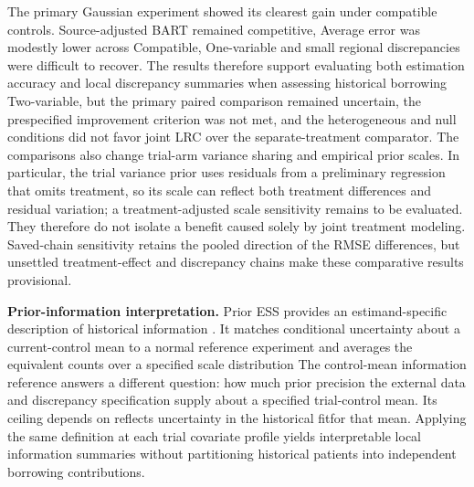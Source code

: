 \documentclass[11pt]{article}
\theoremstyle{remark}\newtheorem{remark}{Remark}[section]
\providecommand{\DIFaddtex}[1]{{\protect\color{blue} \sf #1}} %
\providecommand{\DIFdeltex}[1]{{\protect\color{red} \scriptsize #1}} %
\providecommand{\DIFaddbegin}{} %
\providecommand{\DIFaddend}{} %
\providecommand{\DIFdelbegin}{} %
\providecommand{\DIFdelend}{} %
\providecommand{\DIFadd}[1]{\texorpdfstring{\DIFaddtex{#1}}{#1}} %
\providecommand{\DIFdel}[1]{\texorpdfstring{\DIFdeltex{#1}}{}} %
\begin{document}
\DIFadd{The primary Gaussian experiment showed its clearest gain }\DIFaddend under compatible controls. \DIFdelbegin \DIFdel{Source-adjusted BART remained competitive, }\DIFdelend \DIFaddbegin \DIFadd{Average error was modestly lower across Compatible, One-variable }\DIFaddend and \DIFdelbegin \DIFdel{small regional discrepancies were difficult to recover. The results therefore support evaluating both estimation accuracy and local discrepancy summaries when assessing historical borrowing}\DIFdelend \DIFaddbegin \DIFadd{Two-variable, but the primary paired comparison remained uncertain, the prespecified improvement criterion was not met, and the heterogeneous and null conditions did not favor joint LRC over the separate-treatment comparator. The comparisons also change trial-arm variance sharing and empirical prior scales. In particular, the trial variance prior uses residuals from a preliminary regression that omits treatment, so its scale can reflect both treatment differences and residual variation; a treatment-adjusted scale sensitivity remains to be evaluated. They therefore do not isolate a benefit caused solely by joint treatment modeling. Saved-chain sensitivity retains the pooled direction of the RMSE differences, but unsettled treatment-effect and discrepancy chains make these comparative results provisional}\DIFaddend .

\DIFdelbegin %
\DIFdel{\textbf{Prior-information interpretation.}
Prior ESS provides an estimand-specific description of historical information . It matches conditional uncertainty about a current-control mean to a normal reference experiment and averages the equivalent counts over a specified scale distribution}\DIFdelend \DIFaddbegin \DIFadd{The control-mean information reference answers a different question: how much prior precision the external data and discrepancy specification supply about a specified trial-control mean}\DIFaddend . Its ceiling \DIFdelbegin \DIFdel{depends on }\DIFdelend \DIFaddbegin \DIFadd{reflects }\DIFaddend uncertainty in the \DIFdelbegin \DIFdel{historical fitfor that mean. Applying the same definition at each trial covariate profile yields interpretable local information summaries without partitioning historical patients into independent borrowing contributions. }%
\end{document}

